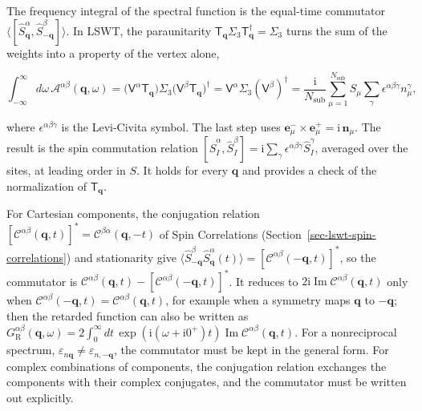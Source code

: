 The frequency integral of the spectral function is the equal-time commutator \(\langle[\hat S_{\mathbf q}^\alpha,\hat S_{-\mathbf q}^\beta]\rangle\). In LSWT, the paraunitarity \(\mathsf T_{\mathbf q}\Sigma_3\mathsf T_{\mathbf q}^\dagger=\Sigma_3\) turns the sum of the weights into a property of the vertex alone,

\begin{equation}\label{eq-lswt-spectral-sum-rule}
\int_{-\infty}^{\infty}d\omega\,\mathcal A^{\alpha\beta}(\mathbf q,\omega)
=\big(\mathsf V^\alpha\mathsf T_{\mathbf q}\big)\Sigma_3\big(\mathsf V^\beta\mathsf T_{\mathbf q}\big)^\dagger
=\mathsf V^\alpha\Sigma_3(\mathsf V^\beta)^\dagger
=\frac{\mathrm i}{N_{\mathrm{sub}}}\sum_{\mu=1}^{N_{\mathrm{sub}}}S_\mu\sum_\gamma\epsilon^{\alpha\beta\gamma}n_\mu^\gamma,
\end{equation}

where \(\epsilon^{\alpha\beta\gamma}\) is the Levi-Civita symbol. The last step uses \(\mathbf e_\mu^-\times\mathbf e_\mu^+=\mathrm i\,\mathbf n_\mu\). The result is the spin commutation relation \([\hat S_I^\alpha,\hat S_I^\beta]=\mathrm i\sum_\gamma\epsilon^{\alpha\beta\gamma}\hat S_I^\gamma\), averaged over the sites, at leading order in \(S\). It holds for every \(\mathbf q\) and provides a check of the normalization of \(\mathsf T_{\mathbf q}\).

For Cartesian components, the conjugation relation \([\mathcal C^{\alpha\beta}(\mathbf q,t)]^*=\mathcal C^{\beta\alpha}(\mathbf q,-t)\) of Spin Correlations (Section~\ref{sec-lswt-spin-correlations}) and stationarity give \(\langle\hat S_{-\mathbf q}^\beta\hat S_{\mathbf q}^\alpha(t)\rangle=[\mathcal C^{\alpha\beta}(-\mathbf q,t)]^*\), so the commutator is \(\mathcal C^{\alpha\beta}(\mathbf q,t)-[\mathcal C^{\alpha\beta}(-\mathbf q,t)]^*\). It reduces to \(2\mathrm i\operatorname{Im}\mathcal C^{\alpha\beta}(\mathbf q,t)\) only when \(\mathcal C^{\alpha\beta}(-\mathbf q,t)=\mathcal C^{\alpha\beta}(\mathbf q,t)\), for example when a symmetry maps \(\mathbf q\) to \(-\mathbf q\); then the retarded function can also be written as \(G_{\mathrm R}^{\alpha\beta}(\mathbf q,\omega)=2\int_0^\infty dt\,\exp(\mathrm i(\omega+\mathrm i0^+)t)\operatorname{Im}\mathcal C^{\alpha\beta}(\mathbf q,t)\). For a nonreciprocal spectrum, \(\varepsilon_{n\mathbf q}\ne\varepsilon_{n,-\mathbf q}\), the commutator must be kept in the general form. For complex combinations of components, the conjugation relation exchanges the components with their complex conjugates, and the commutator must be written out explicitly.

